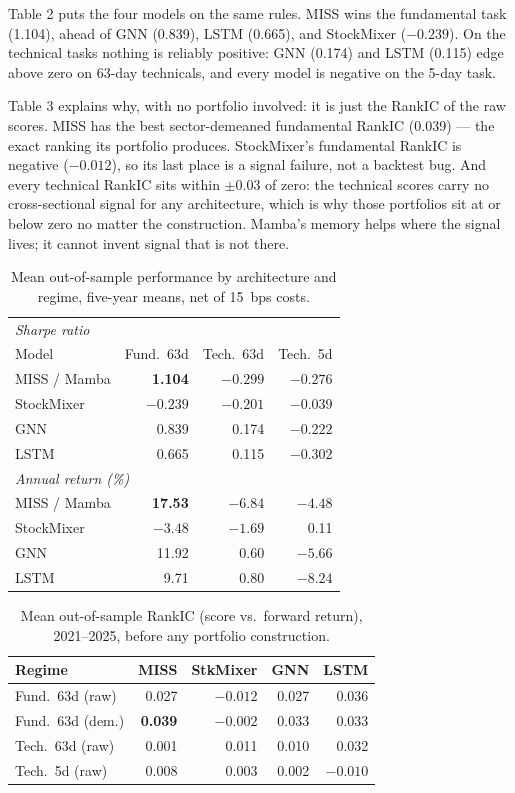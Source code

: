 \documentclass[11pt,twocolumn]{article}
\begin{document}
Table 2 puts the four models on the same rules. MISS wins the fundamental
task (1.104), ahead of GNN (0.839), LSTM (0.665), and StockMixer
($-0.239$). On the technical tasks nothing is reliably positive: GNN
(0.174) and LSTM (0.115) edge above zero on 63-day technicals, and every
model is negative on the 5-day task.

Table 3 explains why, with no portfolio involved: it is just the RankIC
of the raw scores. MISS has the best sector-demeaned fundamental RankIC
(0.039) --- the exact ranking its portfolio produces. StockMixer's
fundamental RankIC is negative ($-0.012$), so its last place is a signal
failure, not a backtest bug. And every technical RankIC sits within
$\pm 0.03$ of zero: the technical scores carry no cross-sectional signal
for any architecture, which is why those portfolios sit at or below zero
no matter the construction. Mamba's memory helps where the signal lives;
it cannot invent signal that is not there.

\begin{table}[t]
\centering\footnotesize
\caption{Mean out-of-sample performance by architecture and regime,
five-year means, net of 15~bps costs.}
\begin{tabular}{l rrr}
\toprule
\multicolumn{4}{l}{\textit{Sharpe ratio}} \\
Model & Fund.\ 63d & Tech.\ 63d & Tech.\ 5d \\
\midrule
MISS / Mamba & \textbf{1.104} & $-0.299$ & $-0.276$ \\
StockMixer & $-0.239$ & $-0.201$ & $-0.039$ \\
GNN & 0.839 & 0.174 & $-0.222$ \\
LSTM & 0.665 & 0.115 & $-0.302$ \\
\midrule
\multicolumn{4}{l}{\textit{Annual return (\%)}} \\
MISS / Mamba & \textbf{17.53} & $-6.84$ & $-4.48$ \\
StockMixer & $-3.48$ & $-1.69$ & 0.11 \\
GNN & 11.92 & 0.60 & $-5.66$ \\
LSTM & 9.71 & 0.80 & $-8.24$ \\
\bottomrule
\end{tabular}
\end{table}

\begin{table}[t]
\centering\footnotesize
\setlength{\tabcolsep}{3.2pt}
\caption{Mean out-of-sample RankIC (score vs.\ forward return),
2021--2025, before any portfolio construction.}
\begin{tabular}{l rrrr}
\toprule
Regime & MISS & StkMixer & GNN & LSTM \\
\midrule
Fund.\ 63d (raw) & 0.027 & $-0.012$ & 0.027 & 0.036 \\
Fund.\ 63d (dem.) & \textbf{0.039} & $-0.002$ & 0.033 & 0.033 \\
Tech.\ 63d (raw) & 0.001 & 0.011 & 0.010 & 0.032 \\
Tech.\ 5d (raw) & 0.008 & 0.003 & 0.002 & $-0.010$ \\
\bottomrule
\end{tabular}
\end{table}
\end{document}
